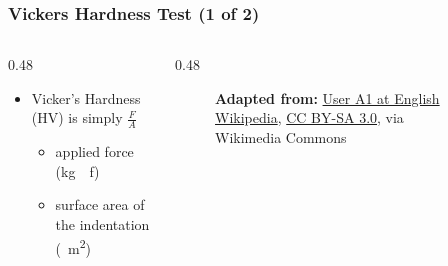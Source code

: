 \begin{frame}
	\frametitle{Vickers Hardness Test (1 of 2)}

    \begin{columns}
        \begin{column}{0.48\linewidth}
            \begin{itemize}[<+- | alert@+>]
                \item Vicker's Hardness (HV) is simply $\frac{F}{A}$ 
                    \begin{itemize}
                        \item[$F$] applied force (\unit{\kilogram{}f}) 
                        \item[$A$] surface area of the indentation (\unit{\milli\square\meter})
                    \end{itemize}
            \end{itemize}
        \end{column}
        \begin{column}{0.48\linewidth}
            \begin{figure}
                \centering
                \resizebox{0.5\linewidth}{!}{
                    
                }

                \vspace{0.5em}
                {\tiny \textbf{Adapted from:}  \href{https://commons.wikimedia.org/wiki/File:Vickers-path.svg}{User A1 at English Wikipedia}, \href{https://creativecommons.org/licenses/by-sa/3.0}{CC BY-SA 3.0}, via Wikimedia Commons\par}
            \end{figure}
        \end{column}        
    \end{columns}
\end{frame}

